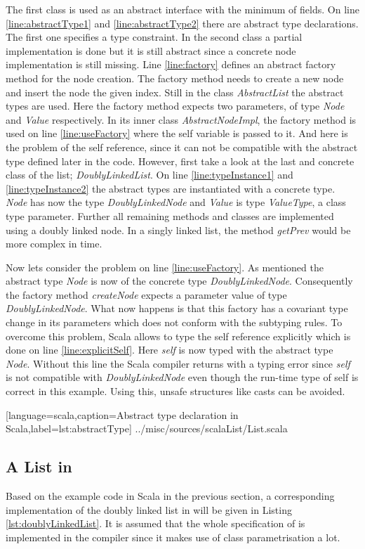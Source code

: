 The first class is used as an abstract interface with the minimum of fields.
On line \ref{line:abstractType1} and \ref{line:abstractType2} there are
abstract type declarations. The first one specifies a type constraint.
In the second class a partial implementation is done but it is
still abstract since a concrete node implementation is still missing. Line
\ref{line:factory} defines an abstract factory method for the node
creation. The factory method needs to create a new node and insert the
node the given index. Still in the class \emph{AbstractList} the abstract
types are used. Here the factory method expects two parameters, of type
\emph{Node} and \emph{Value} respectively. In its inner class \emph{AbstractNodeImpl},
the factory method is used on line \ref{line:useFactory} where the
self variable is passed to it. And here is the problem of the self
reference, since it can not be compatible with the abstract type defined
later in the code. However, first take a look at the last and concrete class
of the list; \emph{DoublyLinkedList}. On line \ref{line:typeInstance1}
and \ref{line:typeInstance2} the abstract types are instantiated with
a concrete type. \emph{Node} has now the type \emph{DoublyLinkedNode} and
\emph{Value} is type \emph{ValueType}, a class type parameter. Further all
remaining methods and classes are implemented using a doubly linked node.
In a singly linked list, the method \emph{getPrev} would be more complex
in time.

Now lets consider the problem on line \ref{line:useFactory}. As
mentioned the abstract type \emph{Node} is now of the concrete
type \emph{DoublyLinkedNode}. Consequently the factory
method \emph{createNode} expects a parameter value of type
\emph{DoublyLinkedNode}. What now happens is that this factory has a
covariant type change in its parameters which does not conform with the
subtyping rules. To overcome this problem, Scala allows to type the
self reference explicitly which is done on line \ref{line:explicitSelf}.
Here \emph{self} is now typed with the abstract type \emph{Node}. Without this
line the Scala compiler returns with a typing error since \emph{self} is not
compatible with \emph{DoublyLinkedNode} even though the run-time
type of self is correct in this example. Using this, unsafe structures
like casts can be avoided.


[language=scala,caption=Abstract type declaration in Scala,label=lst:abstractType]
{../misc/sources/scalaList/List.scala}

\subsection{A List in \ooplss}
Based on the example code in Scala in the previous section, a corresponding
implementation of the doubly linked list in \ooplss will be given in Listing
\ref{lst:doublyLinkedList}. It is assumed that the whole specification
of \ooplss is implemented in the compiler since it makes  use
of class parametrisation a lot.

